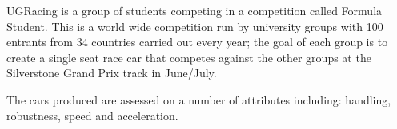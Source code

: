 \label{BG}
UGRacing is a group of students competing in a competition called Formula Student. This is a world wide competition run by university groups with 100 entrants from 34 countries \cite{UGRacing} carried out every year; the goal of each group is to create a single seat race car that competes against the other groups at the Silverstone Grand Prix track in June/July. 

The cars produced are assessed on a number of attributes including: handling, robustness, speed and acceleration.
